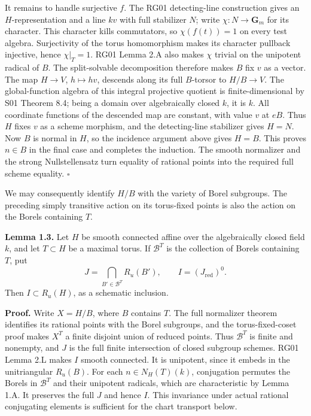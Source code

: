 \documentclass[11pt,a4paper,openany]{report}
\newcounter{none}
\begin{document}
It remains to handle surjective \(f\). The RG01 detecting-line construction gives an \(H\)-representation and a line \(kv\) with full stabilizer \(N\); write \(\chi:N\to\mathbf G_m\) for its character. This character kills commutators, so \(\chi(f(t))=1\) on every test algebra. Surjectivity of the torus homomorphism makes its character pullback injective, hence \(\chi|_T=1\). RG01 Lemma 2.A also makes \(\chi\) trivial on the unipotent radical of \(B\). The split-solvable decomposition therefore makes \(B\) fix \(v\) as a vector. The map \(H\to V\), \(h\mapsto hv\), descends along its full \(B\)-torsor to \(H/B\to V\). The global-function algebra of this integral projective quotient is finite-dimensional by S01 Theorem 8.4; being a domain over algebraically closed \(k\), it is \(k\). All coordinate functions of the descended map are constant, with value \(v\) at \(eB\). Thus \(H\) fixes \(v\) as a scheme morphism, and the detecting-line stabilizer gives \(H=N\). Now \(B\) is normal in \(H\), so the incidence argument above gives \(H=B\). This proves \(n\in B\) in the final case and completes the induction. The smooth normalizer and the strong Nullstellensatz turn equality of rational points into the required full scheme equality. \(\square\)

We may consequently identify \(H/B\) with the variety of Borel subgroups. The preceding simply transitive action on its torus-fixed points is also the action on the Borels containing \(T\).

\textbf{Lemma 1.3.} Let \(H\) be smooth connected affine over the algebraically closed field \(k\), and let \(T\subset H\) be a maximal torus. If \(\mathcal B^T\) is the collection of Borels containing \(T\), put \[
 J=\bigcap_{B'\in\mathcal B^T}R_u(B'),\qquad
 I=(J_{\mathrm{red}})^0.
\] Then \(I\subset R_u(H)\), as a schematic inclusion.

\textbf{Proof.} Write \(X=H/B\), where \(B\) contains \(T\). The full normalizer theorem identifies its rational points with the Borel subgroups, and the torus-fixed-coset proof makes \(X^T\) a finite disjoint union of reduced points. Thus \(\mathcal B^T\) is finite and nonempty, and \(J\) is the full finite intersection of closed subgroup schemes. RG01 Lemma 2.L makes \(I\) smooth connected. It is unipotent, since it embeds in the unitriangular \(R_u(B)\). For each \(n\in N_H(T)(k)\), conjugation permutes the Borels in \(\mathcal B^T\) and their unipotent radicals, which are characteristic by Lemma 1.A. It preserves the full \(J\) and hence \(I\). This invariance under actual rational conjugating elements is sufficient for the chart transport below.
\end{document}
